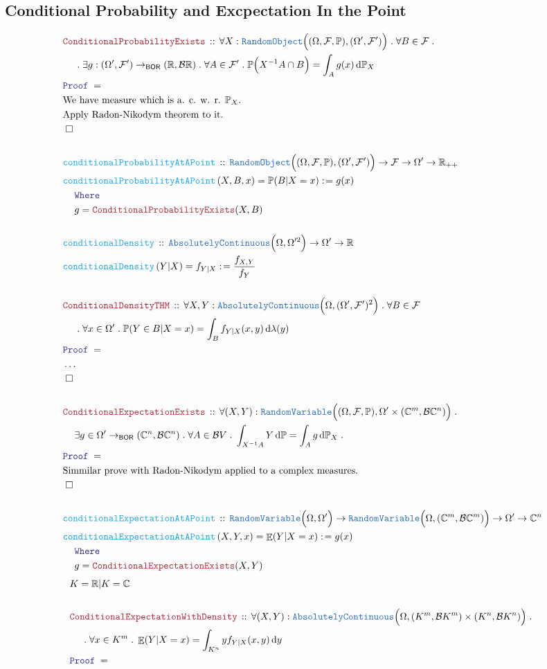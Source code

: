 \documentclass[12pt]{scrartcl}
\newcommand{\TYPE}[1]{\textcolor{NavyBlue}{\mathtt{#1}}}
\newcommand{\FUNC}[1]{\textcolor{Cerulean}{\mathtt{#1}}}
\newcommand{\LOGIC}[1]{\textcolor{Blue}{\mathtt{#1}}}
\newcommand{\THM}[1]{\textcolor{Maroon}{\mathtt{#1}}}
\renewcommand{\.}{\; . \;}
\newcommand{\de}{: \kern 0.1pc =}
\newcommand{\Act}[1]{\left( #1 \right)}
\newcommand{\Theorem}[2]{& \THM{#1} \, :: \, #2 \\ & \Proof = \\ }
\newcommand{\DeclareFunc}[2]{& \FUNC{#1} \, :: \, #2 \\}
\newcommand{\DefineNamedFunc}[4]{&  \FUNC{#1}\Act{#2} = #3 \de #4 \\}
\newcommand{\NewLine}{\\ & \kern 1pc}
\newcommand{\Page}[1]{\begin{align*} #1 \end{align*}   }
\newcommand{\NoProof}{ & \ldots \\ \EndProof}
\newcommand{\Reals}{\mathbb{R} }
\newcommand{\Complex}{\mathbb{C}}
\newcommand{\QED}{\; \square}
\newcommand{\EndProof}{& \QED \\}
\newcommand{\Proof}{\LOGIC{Proof} \; }
\renewcommand{\AC}{\TYPE{AbsolutelyContinuous}}
\newcommand{\BOR}{\mathsf{BOR}}
\newcommand{\F}{\mathcal{F}}
\renewcommand{\O}{\Omega}
\newcommand{\B}{\mathcal{B}}
\renewcommand{\l}{\lambda}
\renewcommand{\P}{\mathbb{P}}
\newcommand{\RV}{\TYPE{RandomVariable}}
\newcommand{\RO}{\TYPE{RandomObject}}
\DeclareMathOperator*{\Exp}{\mathbb{E}}
\begin{document}
\subsection{Conditional Probability and Excpectation In the Point}
\Page{
	\Theorem{ ConditionalProbabilityExists}{ 
		\forall X : \RO\Big( (\O,\F,\P), (\O',\F') \Big) \. \forall B \in \F \. 
		\NewLine \.
		\exists g : (\O',\F') \to_\BOR (\Reals,\B \Reals) \. 
		 \forall A \in \F' \. \P\Big( X^{-1}A \cap B \Big) = \int_A g(x) \, \mathrm{d} \P_X
	}
	& \textrm{We have measure which is a. c. w. r. $\P_X$.} \\
	& \textrm{Apply Radon-Nikodym theorem to it.} \\
	\EndProof
	\\
	\DeclareFunc{conditionalProbabilityAtAPoint}{\RO\Big( (\O,\F,\P), (\O',\F')  \Big) \to \F \to \O' \to \Reals_{++}}
	\DefineNamedFunc{conditionalProbabilityAtAPoint}{ X,B,x}{ \P( B | X = x) }
	{ 
		g(x) \NewLine 
		\LOGIC{Where}
		\NewLine
		g = \THM{ConditionalProbabilityExists}(X,B)
	}
	\\
	\DeclareFunc{conditionalDensity}{\AC\Big( \O,\O'^2 \Big) \to \O' \to \Reals}
	\DefineNamedFunc{conditionalDensity}{Y|X}{f_{Y|X}}{\frac{f_{X,Y}}{f_Y}}
	\\
	\Theorem{ConditionalDensityTHM}{\forall X,Y : \AC\Big( \O ,(\O',\F')^2\Big) \. \forall B \in \F 
	\NewLine
	\. \forall x \in \O' \. \P( Y \in B | X = x) = \int_B f_{Y|X}(x,y) \, \mathrm{d}\l(y)  }
	\NoProof
	\\
	\Theorem{ConditionalExpectationExists}{
		\forall (X,Y) : \RV\Big( (\O,\F,\P), \O' \times (\Complex^m,\B \Complex^n)  \Big) \. 
		\NewLine
		\exists g \in \O' \to_\BOR (\Complex^n, \B \Complex^n)  \. 
		\forall A \in \B V \. 
		\int_{X^{-1}A} Y \, \mathrm{d} \P = \int_{A} g \, \mathrm{d} \P_X \.
		}
	& \textrm{Simmilar prove with Radon-Nikodym applied to a complex measures.} \\
	\EndProof
		\\
	\DeclareFunc{conditionalExpectationAtAPoint}{\RV\Big( \O, \O'  \Big) \to \RV\Big(\O, (\Complex^m,\B \Complex^m) \Big)   \to \O'  \to \Complex^n}
	\DefineNamedFunc{conditionalExpectationAtAPoint}{ X,Y,x  }{\Exp (Y|X = x)}
	{ 
		g(x) \NewLine 
		\LOGIC{Where}
		\NewLine
		g = \THM{ConditionalExpectationExists}(X,Y)
	}
}\Page{
	& K = \Reals | K = \Complex \\
	\\
	\Theorem{ConditionalExpectationWithDensity}{\forall (X,Y) : \AC\Big(\O, (K^m,\B K^m)\times (K^n,\B K^n)\Big) \.  \NewLine \. 
		\forall x \in K^m \. \Exp(Y| X = x) = \int_{K^n} y f_{Y|X}(x,y) \, \mathrm{d}y }
}
\end{document}
